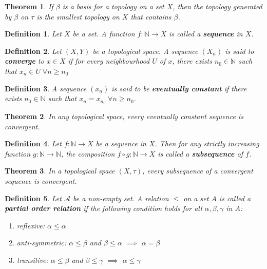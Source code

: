 \documentclass[12pt,twoside]{report}
\newtheorem{defn}{Definition}
\newtheorem{thm}{Theorem}
\begin{document}
\begin{thm}
    If $\beta$ is a basis for a topology on a set $X$, then the topology generated by $\beta$ on $\tau$ is the smallest topology on $X$ that contains $\beta$.
\end{thm}

\begin{defn}
    Let $X$ be a set. A function $f \colon \mathbb{N} \to X$ is called a \textbf{sequence} in $X$.
\end{defn}

\begin{defn}
    Let $\left (X, Y\right )$ be a topological space. A sequence $\left (X_n\right )$ is said to \textbf{converge} to $x \in X$ if for every neighbourhood $U$ of $x$, there exists $n_0 \in \mathbb{N}$ such that $x_n \in U \;\forall n \geq n_0$
\end{defn}

\begin{defn}
    A sequence $\left (x_n\right )$ is said to be \textbf{eventually constant} if there exists $n_0 \in \mathbb{N}$ such that $x_n = x_{n_0} \;\forall n \geq n_0$.
\end{defn}

\begin{thm}
    In any topological space, every eventually constant sequence is convergent.
\end{thm}

\begin{defn}
    Let $f \colon \mathbb{N} \to X$ be a sequence in $X$. Then for any strictly increasing function $g \colon \mathbb{N} \to \mathbb{N}$, the composition $f \circ g \colon \mathbb{N} \to X$ is called a \textbf{subsequence} of $f$.
\end{defn}

\begin{thm}
    In a topological space $\left (X, \tau\right )$, every subsequence of a convergent sequence is convergent.
\end{thm}

\begin{defn}
    Let $\mathcal{A}$ be a non-empty set. A relation $\leq$ on a set $A$ is called a \textbf{partial order relation} if the following condition holds for all $\alpha, \beta, \gamma$ in $A$:
    \begin{enumerate}
        \item reflexive: $\alpha \leq \alpha$
        \item anti-symmetric: $\alpha \leq \beta$ and $\beta \leq \alpha$ $\implies$ $\alpha = \beta$
        \item transitive: $\alpha \leq \beta$ and $\beta \leq \gamma$ $\implies$ $\alpha \leq \gamma$
    \end{enumerate}
\end{defn}
\end{document}
